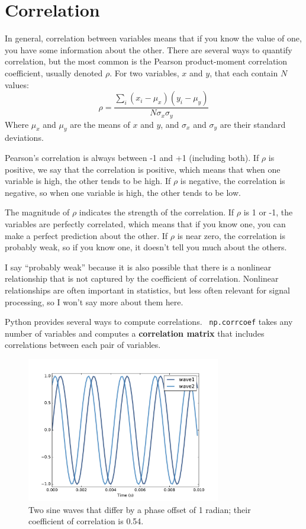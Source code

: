 \documentclass[12pt]{book}
\begin{document}
\section{Correlation}

In general, correlation between variables means that if you know the
value of one, you have some information about the other.  There are
several ways to quantify correlation, but the most common is the
Pearson product-moment correlation coefficient, usually denoted
$\rho$.  For two variables, $x$ and $y$, that each contain $N$ values:
%
\[ \rho = \frac{ \sum_i (x_i - \mu_x) (y_i - \mu_y)}{N \sigma_x \sigma_y} \]
%
Where $\mu_x$ and $\mu_y$ are the means of $x$ and $y$, and
$\sigma_x$ and $\sigma_y$ are their standard deviations.

Pearson's correlation is always between -1 and +1 (including both).
If $\rho$ is positive, we say that the correlation is positive,
which means that when one variable is high, the other tends to be
high.  If $\rho$ is negative, the correlation is negative, so
when one variable is high, the other tends to be low.

The magnitude of $\rho$ indicates the strength of the correlation.  If
$\rho$ is 1 or -1, the variables are perfectly correlated, which means
that if you know one, you can make a perfect prediction about the
other.  If $\rho$ is near zero, the correlation is probably weak, so
if you know one, it doesn't tell you much about the others.

I say ``probably weak'' because it is also possible that there is
a nonlinear relationship that is not captured by the coefficient
of correlation.  Nonlinear relationships are often important in
statistics, but less often relevant for signal processing, so I
won't say more about them here.

Python provides several ways to compute correlations.  {\tt
  np.corrcoef} takes any number of variables and computes a {\bf
  correlation matrix} that includes correlations between each pair of
variables.

\begin{figure}
\centerline{\includegraphics[height=2.5in]{figs/autocorr1.pdf}}
\caption{Two sine waves that differ by a phase offset of 1 radian;
their coefficient of correlation is 0.54.}
\label{fig.autocorr1}
\end{figure}
\end{document}
